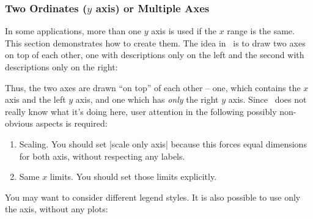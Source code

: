 \subsubsection[Two Ordinates]{Two Ordinates ($y$ axis) or Multiple Axes}
{%
%
In some applications, more than one $y$ axis is used if the $x$ range is the same. This section demonstrates how to create them. The idea in \PGFPlots\ is to draw two axes on top of each other, one with descriptions only on the left and the second with descriptions only on the right:

\begin{codeexample}[]
\end{codeexample}
\noindent Thus, the two axes are drawn ``on top'' of each other -- one, which contains the $x$ axis and the left $y$ axis, and one which has \emph{only} the right $y$ axis. Since \PGFPlots\ does not really know what it's doing here, user attention in the following possibly non-obvious aspects is required:
\begin{enumerate}
	\item Scaling. You should set |scale only axis| because this forces equal dimensions for both axis, without respecting any labels.
	\item Same $x$ limits. You should set those limits explicitly.
\end{enumerate}
You may want to consider different legend styles.
It is also possible to use only the axis, without any plots:
\begin{codeexample}[]
\end{codeexample}
}

